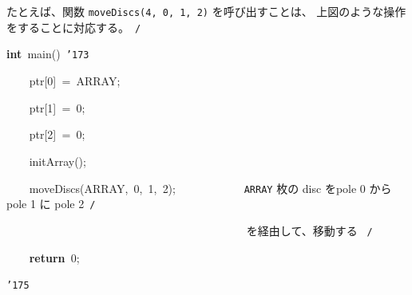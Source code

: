 \documentclass[a4paper,10pt]{article}
\def\mc{\relax}
\begin{document}
たとえば、関数 {\tt moveDiscs(4, 0, 1, 2)} を呼び出すことは、
上図のような操作をすることに対応する。\hfill \rm\mc \ {\tt *}{\tt /}
\tt\mc 

\noindent
\mbox{}\hfill

\noindent
\mbox{}\textbf{int}{\tt\mc \ }main(){\tt\mc \ }{\tt\char'173}

\noindent
\mbox{}{\tt\mc \ }{\tt\mc \ }{\tt\mc \ }{\tt\mc \ }ptr[0]{\tt\mc \ }={\tt\mc \ }ARRAY;

\noindent
\mbox{}{\tt\mc \ }{\tt\mc \ }{\tt\mc \ }{\tt\mc \ }ptr[1]{\tt\mc \ }={\tt\mc \ }0;

\noindent
\mbox{}{\tt\mc \ }{\tt\mc \ }{\tt\mc \ }{\tt\mc \ }ptr[2]{\tt\mc \ }={\tt\mc \ }0;

\noindent
\mbox{}\hfill

\noindent
\mbox{}{\tt\mc \ }{\tt\mc \ }{\tt\mc \ }{\tt\mc \ }initArray();

\noindent
\mbox{}{\tt\mc \ }{\tt\mc \ }{\tt\mc \ }{\tt\mc \ }moveDiscs(ARRAY,{\tt\mc \ }0,{\tt\mc \ }1,{\tt\mc \ }2);{\tt\mc \ }{\tt\mc \ }{\tt\mc \ }{\tt\mc \ }{\tt\mc \ }{\tt\mc \ }{\tt\mc \ }{\tt\mc \ }{\tt\mc \ }{\tt\mc \ }\rm\mc {\tt /}{\tt *}\  \ {\tt ARRAY} 枚の disc をpole 0 から pole 1 に pole 2\hfill \rm\mc \ {\tt *}{\tt /}
\tt\mc 

\noindent
\mbox{}{\tt\mc \ }{\tt\mc \ }{\tt\mc \ }{\tt\mc \ }{\tt\mc \ }{\tt\mc \ }{\tt\mc \ }{\tt\mc \ }{\tt\mc \ }{\tt\mc \ }{\tt\mc \ }{\tt\mc \ }{\tt\mc \ }{\tt\mc \ }{\tt\mc \ }{\tt\mc \ }{\tt\mc \ }{\tt\mc \ }{\tt\mc \ }{\tt\mc \ }{\tt\mc \ }{\tt\mc \ }{\tt\mc \ }{\tt\mc \ }{\tt\mc \ }{\tt\mc \ }{\tt\mc \ }{\tt\mc \ }{\tt\mc \ }{\tt\mc \ }{\tt\mc \ }{\tt\mc \ }{\tt\mc \ }{\tt\mc \ }{\tt\mc \ }{\tt\mc \ }{\tt\mc \ }{\tt\mc \ }{\tt\mc \ }{\tt\mc \ }\rm\mc {\tt /}{\tt *}\  \ を経由して、移動する \hfill \rm\mc \ {\tt *}{\tt /}
\tt\mc 

\noindent
\mbox{}{\tt\mc \ }{\tt\mc \ }{\tt\mc \ }{\tt\mc \ }\textbf{return}{\tt\mc \ }0;

\noindent
\mbox{}{\tt\char'175}

\rm\mc
\end{document}
